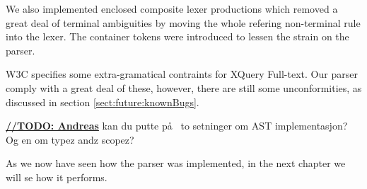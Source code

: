 We also implemented enclosed composite lexer productions which removed a great deal of terminal ambiguities by moving the whole refering non-terminal rule into the lexer. The container tokens were introduced to lessen the strain on the parser.

W3C specifies some extra-gramatical contraints for XQuery Full-text. Our parser comply with a great deal of these, however, there are still some unconformities, as discussed in section \ref{sect:future:knownBugs}.

\underline{\textbf{\LARGE //TODO: Andreas}} kan du putte p\aa~ to setninger om AST implementasjon? Og en om typez andz scopez?

As we now have seen how the parser was implemented, in the next chapter we will se how it performs.